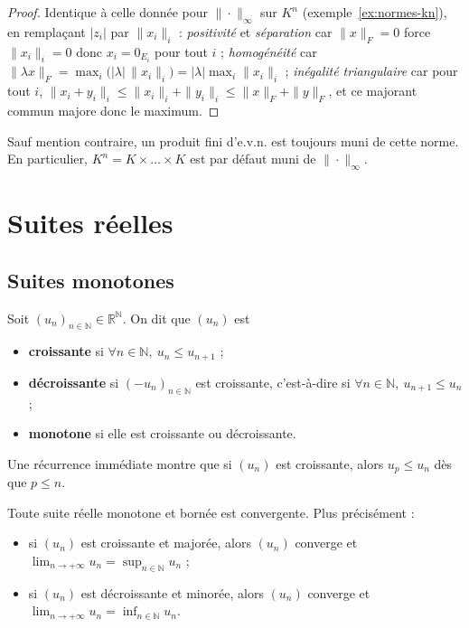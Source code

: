 \begin{proof}
Identique à celle donnée pour $\|\cdot\|_\infty$ sur $K^n$ (exemple~\ref{ex:normes-kn}), en remplaçant $|z_i|$ par $\|x_i\|_i$ :
\emph{positivité} et \emph{séparation} car $\|x\|_F=0$ force $\|x_i\|_i=0$ donc $x_i=0_{E_i}$ pour tout $i$ ;
\emph{homogénéité} car $\|\lambda x\|_F=\max_i\big(|\lambda|\,\|x_i\|_i\big)=|\lambda|\max_i\|x_i\|_i$ ;
\emph{inégalité triangulaire} car pour tout $i$, $\|x_i+y_i\|_i\leq\|x_i\|_i+\|y_i\|_i\leq\|x\|_F+\|y\|_F$, et ce majorant commun majore donc le maximum.
\end{proof}

\begin{remarque}
Sauf mention contraire, un produit fini d'e.v.n. est toujours muni de cette norme. En particulier, $K^n=K\times\dots\times K$ est par défaut muni de $\|\cdot\|_\infty$.
\end{remarque}

\section{Suites réelles}

\subsection{Suites monotones}

\begin{defi}
\label{defi:suite-monotone}
Soit $(u_n)_{n\in\mathbb{N}}\in\mathbb{R}^{\mathbb{N}}$. On dit que $(u_n)$ est
\begin{itemize}
\item \textbf{croissante} si $\forall n\in\mathbb{N},\ u_n\leq u_{n+1}$ ;
\item \textbf{décroissante} si $(-u_n)_{n\in\mathbb{N}}$ est croissante, c'est-à-dire si $\forall n\in\mathbb{N},\ u_{n+1}\leq u_n$ ;
\item \textbf{monotone} si elle est croissante ou décroissante.
\end{itemize}
\end{defi}

\begin{remarque}
Une récurrence immédiate montre que si $(u_n)$ est croissante, alors $u_p\leq u_n$ dès que $p\leq n$.
\end{remarque}

\begin{theo}
\label{theo:limite-monotone}
Toute suite réelle monotone et bornée est convergente. Plus précisément :
\begin{itemize}
\item si $(u_n)$ est croissante et majorée, alors $(u_n)$ converge et $\displaystyle\lim_{n\to+\infty}u_n=\sup_{n\in\mathbb{N}}u_n$ ;
\item si $(u_n)$ est décroissante et minorée, alors $(u_n)$ converge et $\displaystyle\lim_{n\to+\infty}u_n=\inf_{n\in\mathbb{N}}u_n$.
\end{itemize}
\end{theo}

